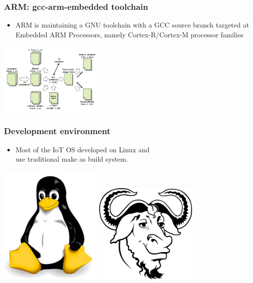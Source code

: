 \documentclass{beamer}
\begin{document}
\begin{frame}
	\frametitle{ARM: gcc-arm-embedded toolchain}
	\vspace{.1cm}
		\begin{itemize}
			\justifying
			\item ARM is maintaining a GNU toolchain with a GCC source branch targeted at Embedded ARM Processors, namely Cortex-R/Cortex-M processor families	
		\end{itemize}
	\vspace{.5cm}
	\hspace*{5.5cm} \includegraphics[width=5cm]{figs/CompilerAssemblerToolchain_gcc.png}
\end{frame}

\begin{frame}
	\frametitle{Development environment}
	\vspace{.1cm}
	\begin{itemize}
		\justifying
		\item Most of the IoT OS developed on \textcolor{TextOrange}{Linux} and\\
		use \textcolor{TextGreen}{traditional make} as build system.
	\end{itemize}
	\vspace{.5cm}
	\hspace*{.5cm}
	\includegraphics[width=5cm]{figs/linux-logo.jpeg}
	\includegraphics[width=5cm]{figs/gun-logo.png}
\end{frame}
\end{document}
